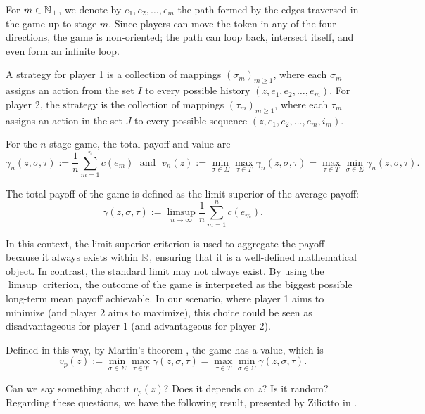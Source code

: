        For $m \in \mathbb{N}_+$, we denote by $e_1, e_2, \ldots, e_m$ the path formed by the edges traversed in the game up to stage $m$. Since players can move the token in any of the four directions, the game is non-oriented; the path can loop back, intersect itself, and even form an infinite loop.

        A strategy for player 1 is a collection of mappings $(\sigma_m)_{m \geq 1}$, where each $\sigma_m$ assigns an action from the set $I$ to every possible history $(z, e_1, e_2, \ldots, e_m)$. For player 2, the strategy is the collection of mappings $(\tau_m)_{m \geq 1}$, where each $\tau_m$  assigns an action in the set $J$ to every possible sequence $(z, e_1, e_2, \ldots, e_m, i_m)$.

        For the $n$-stage game, the total payoff and value are
        \[
        	\gamma_n(z, \sigma, \tau) := \frac{1}{n}\sum_{m = 1}^{n}c(e_m) \; \text{ and } \; v_n(z) := \min_{\sigma \in \Sigma}\max_{\tau \in T} \gamma_n(z, \sigma, \tau) = \max_{\tau \in T}\min_{\sigma \in \Sigma} \gamma_n(z, \sigma, \tau).
        \]

        The total payoff of the game is defined as the limit superior of the average payoff:
        \[
        	\gamma(z, \sigma, \tau) := \limsup_{n \to \infty}\frac{1}{n}\sum_{m = 1}^{n}c(e_m).
        \]
        
        \begin{remark}
            In this context, the limit superior criterion is used to aggregate the payoff because it always exists within $\bar{\mathbb{R}}$, ensuring that it is a well-defined mathematical object. In contrast, the standard limit may not always exist. By using the $\limsup$ criterion, the outcome of the game is interpreted as the biggest possible long-term mean payoff achievable. In our scenario, where player 1 aims to minimize (and player 2 aims to maximize), this choice could be seen as disadvantageous for player 1 (and advantageous for player 2).
        \end{remark}

        Defined in this way, by Martin's theorem \cite{Martin1998}, the game has a value, which is
        \[
            v_p(z) := \min_{\sigma \in \Sigma}\max_{\tau \in T} \gamma(z, \sigma, \tau) = \max_{\tau \in T}\min_{\sigma \in \Sigma} \gamma(z, \sigma, \tau).
        \]

        Can we say something about $v_p(z)$? Does it depends on $z$? Is it random? Regarding these questions, we have the following result, presented by Ziliotto in \cite{Ziliotto2023}.

